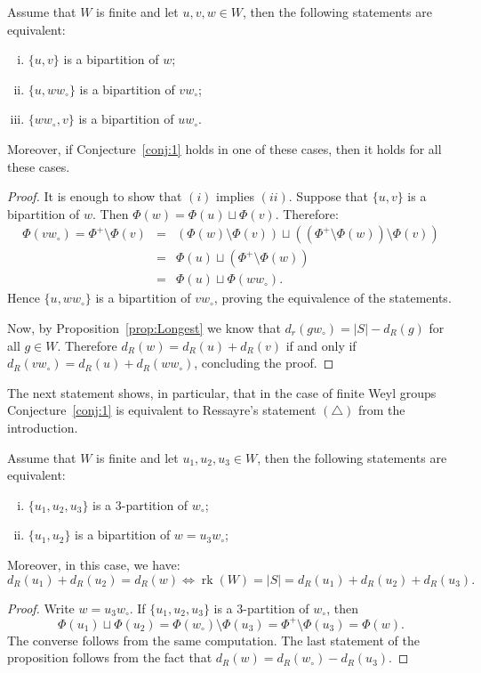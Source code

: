\documentclass[Unicode]{cedram-alco}
\theoremstyle{definition}
\newcommand{\rank}{\operatorname{rk}}
\begin{document}
\begin{prop}\label{prop:ReductionLongest} Assume that $W$ is finite and let $u,v,w\in W$, then the following statements are equivalent:
\begin{enumerate}[(i)]
\item $\{u,v\}$ is a bipartition of $w$;
\item  $\{u,ww_\circ\}$ is a bipartition of $vw_\circ$;
\item $\{ww_\circ,v\}$ is a bipartition of $uw_\circ$.
\end{enumerate}
Moreover, if Conjecture~\ref{conj:1} holds in one of these cases, then it holds for all these cases. 
\end{prop}
\begin{proof} It is enough to show that $(i)$ implies $(ii)$. Suppose that $\{u,v\}$ is a bipartition of $w$. Then $\Phi(w)=\Phi(u)\sqcup \Phi(v)$. Therefore:
\begin{eqnarray*}
\Phi(vw_\circ)=\Phi^+\setminus\Phi(v)&=&(\Phi(w)\setminus \Phi(v)) \sqcup  ((\Phi^+\setminus\Phi(w))\setminus \Phi(v))\\
&=& \Phi(u) \sqcup  (\Phi^+\setminus\Phi(w))\\
&=& \Phi(u) \sqcup  \Phi(ww_\circ).
\end{eqnarray*}
Hence $\{u,ww_\circ\}$ is a bipartition of $vw_\circ$, proving the equivalence of the statements. 

Now, by Proposition~\ref{prop:Longest} we know that $d_r(gw_\circ)= |S|-d_R(g)$ for all $g\in W$. Therefore $d_R(w)=d_R(u)+d_R(v)$ if and only if $d_R(vw_\circ)=d_R(u)+d_R(ww_\circ)$, concluding the proof.
\end{proof}

The next statement shows, in particular, that in the case of finite Weyl groups Conjecture~\ref{conj:1} is equivalent to Ressayre's statement $(\triangle)$ from the introduction.

\begin{prop}\label{prop:Ressayre} Assume that $W$ is finite and let $u_1,u_2,u_3\in W$, then the following statements are equivalent:
\begin{enumerate}[(i)]
\item $\{u_1,u_2,u_3\}$ is a $3$-partition of $w_\circ$;
\item  $\{u_1,u_2\}$ is a bipartition of $w=u_3w_\circ$;
\end{enumerate}
Moreover, in this case, we have:
$$
d_R(u_1)+d_R(u_2)=d_R(w)\iff\rank(W)=|S|=d_R(u_1)+d_R(u_2)+d_R(u_3). 
$$
\end{prop}
\begin{proof} Write $w=u_3w_\circ$. If $\{u_1,u_2,u_3\}$ is a $3$-partition of $w_\circ$, then 
$$
\Phi(u_1)\sqcup\Phi(u_2)=\Phi(w_\circ)\setminus\Phi(u_3)=\Phi^+\setminus\Phi(u_3) = \Phi(w).
$$
The converse follows from the same computation. The last statement of the proposition follows from the fact that $d_R(w)=d_R(w_\circ)-d_R(u_3)$.
\end{proof}
\end{document}
